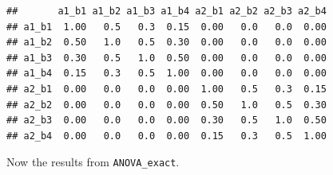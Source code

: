 \documentclass[]{book}
\newenvironment{Shaded}{\begin{snugshade}}{\end{snugshade}}
\newcommand{\DataTypeTok}[1]{\textcolor[rgb]{0.13,0.29,0.53}{#1}}
\newcommand{\DecValTok}[1]{\textcolor[rgb]{0.00,0.00,0.81}{#1}}
\newcommand{\FloatTok}[1]{\textcolor[rgb]{0.00,0.00,0.81}{#1}}
\newcommand{\KeywordTok}[1]{\textcolor[rgb]{0.13,0.29,0.53}{\textbf{#1}}}
\newcommand{\NormalTok}[1]{#1}
\newcommand{\OperatorTok}[1]{\textcolor[rgb]{0.81,0.36,0.00}{\textbf{#1}}}
\newcommand{\OtherTok}[1]{\textcolor[rgb]{0.56,0.35,0.01}{#1}}
\newcommand{\StringTok}[1]{\textcolor[rgb]{0.31,0.60,0.02}{#1}}
\begin{document}
\begin{Shaded}
\end{Shaded}

\begin{verbatim}
##       a1_b1 a1_b2 a1_b3 a1_b4 a2_b1 a2_b2 a2_b3 a2_b4
## a1_b1  1.00   0.5   0.3  0.15  0.00   0.0   0.0  0.00
## a1_b2  0.50   1.0   0.5  0.30  0.00   0.0   0.0  0.00
## a1_b3  0.30   0.5   1.0  0.50  0.00   0.0   0.0  0.00
## a1_b4  0.15   0.3   0.5  1.00  0.00   0.0   0.0  0.00
## a2_b1  0.00   0.0   0.0  0.00  1.00   0.5   0.3  0.15
## a2_b2  0.00   0.0   0.0  0.00  0.50   1.0   0.5  0.30
## a2_b3  0.00   0.0   0.0  0.00  0.30   0.5   1.0  0.50
## a2_b4  0.00   0.0   0.0  0.00  0.15   0.3   0.5  1.00
\end{verbatim}

Now the results from \texttt{ANOVA\_exact}.

\begin{Shaded}
\end{Shaded}
\end{document}
